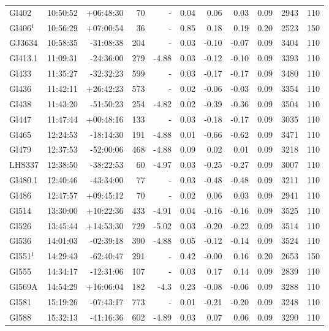\documentclass[referee]{aa}
\begin{document}
{\begin{longtable}{l r r r r r r r r r r}
Gl402 & 10:50:52 & +06:48:30 & 70 &    - & 0.04 & 0.06 & 0.03 & 0.09 & 2943 &  110 \\
Gl406$^1$ & 10:56:29 & +07:00:54 & 36 &    - & 0.85 & 0.18 & 0.19 & 0.20 & 2523 &  150 \\
GJ3634 & 10:58:35 & -31:08:38 & 204 &    - & 0.03 & -0.10 & -0.07 & 0.09 & 3404 &  110 \\
Gl413.1 & 11:09:31 & -24:36:00 & 279 & -4.88 & 0.03 & -0.12 & -0.10 & 0.09 & 3393 &  110 \\
Gl433 & 11:35:27 & -32:32:23 & 599 &    - & 0.03 & -0.17 & -0.17 & 0.09 & 3480 &  110 \\
Gl436 & 11:42:11 & +26:42:23 & 573 &    - & 0.02 & -0.06 & -0.03 & 0.09 & 3354 &  110 \\
Gl438 & 11:43:20 & -51:50:23 & 254 & -4.82 & 0.02 & -0.39 & -0.36 & 0.09 & 3504 &  110 \\
Gl447 & 11:47:44 & +00:48:16 & 133 &    - & 0.03 & -0.18 & -0.17 & 0.09 & 3035 &  110 \\
Gl465 & 12:24:53 & -18:14:30 & 191 & -4.88 & 0.01 & -0.66 & -0.62 & 0.09 & 3471 &  110 \\
Gl479 & 12:37:53 & -52:00:06 & 468 & -4.88 & 0.09 & 0.02 & 0.01 & 0.09 & 3218 &  110 \\
LHS337 & 12:38:50 & -38:22:53 & 60 & -4.97 & 0.03 & -0.25 & -0.27 & 0.09 & 3007 &  110 \\
Gl480.1 & 12:40:46 & -43:34:00 & 77 &    - & 0.03 & -0.48 & -0.48 & 0.09 & 3211 &  110 \\
Gl486 & 12:47:57 & +09:45:12 & 70 &    - & 0.02 & 0.06 & 0.03 & 0.09 & 2941 &  110 \\
Gl514 & 13:30:00 & +10:22:36 & 433 & -4.91 & 0.04 & -0.16 & -0.16 & 0.09 & 3525 &  110 \\
Gl526 & 13:45:44 & +14:53:30 & 729 & -5.02 & 0.03 & -0.20 & -0.22 & 0.09 & 3514 &  110 \\
Gl536 & 14:01:03 & -02:39:18 & 390 & -4.88 & 0.05 & -0.12 & -0.14 & 0.09 & 3524 &  110 \\
Gl551$^1$ & 14:29:43 & -62:40:47 & 291 &    - & 0.42 & -0.00 & 0.16 & 0.20 & 2653 &  150 \\
Gl555 & 14:34:17 & -12:31:06 & 107 &    - & 0.03 & 0.17 & 0.14 & 0.09 & 2839 &  110 \\
Gl569A & 14:54:29 & +16:06:04 & 182 & -4.3 & 0.23 & -0.08 & -0.06 & 0.09 & 3288 &  110 \\
Gl581 & 15:19:26 & -07:43:17 & 773 &    - & 0.01 & -0.21 & -0.20 & 0.09 & 3248 &  110 \\
Gl588 & 15:32:13 & -41:16:36 & 602 & -4.89 & 0.03 & 0.07 & 0.06 & 0.09 & 3290 &  110 \\

\end{longtable}}
\end{document}
